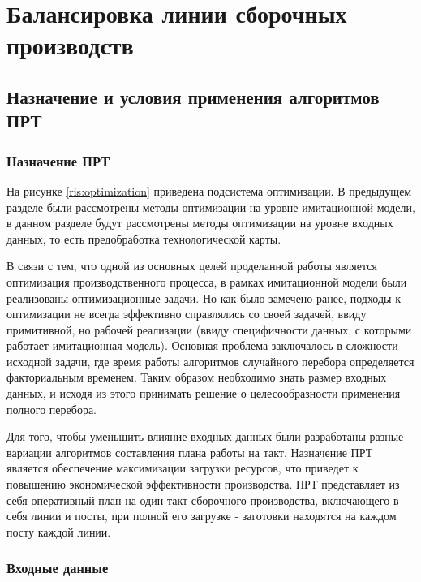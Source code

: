 \chapter{Балансировка линии сборочных производств}

\label{ALBP}


\section{Назначение и условия применения алгоритмов ПРТ}
\subsection{Назначение ПРТ}
На рисунке \ref{ris:optimization} приведена подсистема оптимизации. В предыдущем разделе были рассмотрены методы оптимизации на уровне имитационной модели, в данном разделе будут рассмотрены методы оптимизации на уровне входных данных, то есть предобработка технологической карты.

В связи с тем, что одной из основных целей проделанной работы является оптимизация производственного процесса, в рамках имитационной модели были реализованы оптимизационные задачи. Но как было замечено ранее, подходы к оптимизации не всегда эффективно справлялись со своей задачей, ввиду примитивной, но рабочей реализации (ввиду специфичности данных, с которыми работает имитационная модель). Основная проблема заключалось в сложности исходной задачи, где время работы алгоритмов случайного перебора определяется факториальным временем. Таким образом необходимо знать размер входных данных, и исходя из этого принимать решение о целесообразности применения полного перебора.

Для того, чтобы уменьшить влияние входных данных были разработаны разные вариации алгоритмов составления плана работы на такт. Назначение ПРТ является обеспечение максимизации загрузки ресурсов, что приведет к повышению экономической эффективности производства. ПРТ представляет из себя оперативный план на один такт сборочного производства, включающего в себя линии и посты, при полной его загрузке - заготовки находятся на каждом посту каждой линии.

\subsection{Входные данные}

